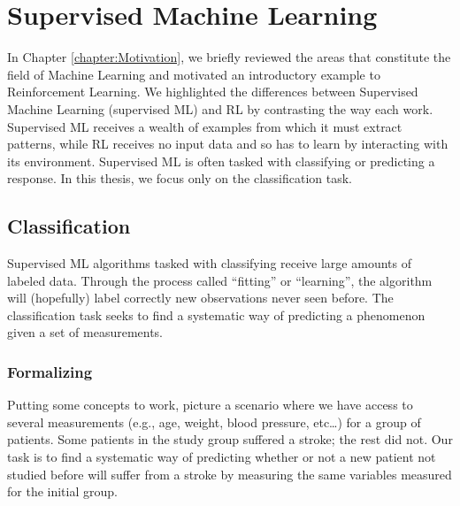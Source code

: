 \chapter{Supervised Machine Learning}
\label{chapter:SupervisedLearning}

In Chapter \ref{chapter:Motivation}, we briefly reviewed the areas that
constitute the field of Machine Learning and motivated an introductory example
to Reinforcement Learning. We highlighted the differences between Supervised
Machine Learning (supervised ML) and RL by contrasting the way each work.
Supervised ML receives a wealth of examples from which it must extract patterns,
while RL receives no input data and so has to learn by interacting with its
environment. Supervised ML is often tasked with classifying or predicting a
response. In this thesis, we focus only on the classification task.

\section{Classification}
Supervised ML algorithms tasked with classifying receive large amounts of
labeled data. Through the process called ``fitting'' or ``learning'', the
algorithm will (hopefully) label correctly new observations never seen before.
The classification task seeks to find a systematic way of predicting a
phenomenon given a set of measurements.

\subsection{Formalizing} \label{sss:formalizing-trees}
Putting some concepts to work, picture a scenario where we have access to
several measurements (e.g., age, weight, blood pressure, etc\dots) for a group
of patients. Some patients in the study group suffered a stroke; the rest did
not. Our task is to find a systematic way of predicting whether or not a new
patient not studied before will suffer from a stroke by measuring the same
variables measured for the initial group.

